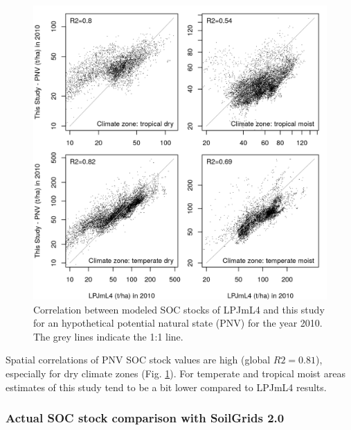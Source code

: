 \documentclass[gc, manuscript]{copernicus}
\begin{document}
\begin{figure}[h]
\includegraphics[width=13cm]{../ResultNotebooks/Output/Images/scatterCompareLPJmL42010_pnv} \caption{Correlation between modeled SOC stocks of LPJmL4 and this study for an hypothetical potential natural state (PNV) for the year 2010. The grey lines indicate the 1:1 line.}\label{fig:SOCLPJmL4}
\end{figure}

Spatial correlations of PNV SOC stock values are high (global \(R2=0.81\)), especially for dry climate zones (Fig. \ref{fig:SOCLPJmL4}). For temperate and tropical moist areas estimates of this study tend to be a bit lower compared to LPJmL4 results.

\hypertarget{actual-soc-stock-comparison-with-soilgrids-2.0}{%
\subsubsection{Actual SOC stock comparison with SoilGrids 2.0}\label{actual-soc-stock-comparison-with-soilgrids-2.0}}
\end{document}
